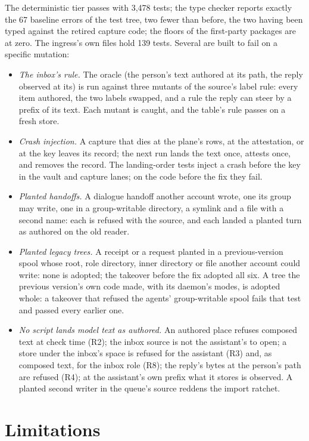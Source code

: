 \documentclass[11pt]{article}
\theoremstyle{plain}
\theoremstyle{definition}
\theoremstyle{remark}
\begin{document}
The deterministic tier passes with 3,478 tests; the type checker reports exactly the 67
baseline errors of the test tree, two fewer than before, the two having been typed against the
retired capture code; the floors of the first-party packages are at zero. The ingress's own
files hold 139 tests. Several are built to fail on a specific mutation:
\begin{itemize}
\item \emph{The inbox's rule.} The oracle (the person's text authored at its path, the reply
  observed at its) is run against three mutants of the source's label rule: every item authored,
  the two labels swapped, and a rule the reply can steer by a prefix of its text. Each mutant is
  caught, and the table's rule passes on a fresh store.
\item \emph{Crash injection.} A capture that dies at the plane's rows, at the attestation, or at
  the key leaves its record; the next run lands the text once, attests once, and removes the
  record. The landing-order tests inject a crash before the key in the vault and capture lanes;
  on the code before the fix they fail.
\item \emph{Planted handoffs.} A dialogue handoff another account wrote, one its group may
  write, one in a group-writable directory, a symlink and a file with a second name: each is
  refused with the source, and each landed a planted turn as authored on the old reader.
\item \emph{Planted legacy trees.} A receipt or a request planted in a previous-version spool
  whose root, role directory, inner directory or file another account could write: none is
  adopted; the takeover before the fix adopted all six. A tree the previous version's own code
  made, with its daemon's modes, is adopted whole: a takeover that refused the agents'
  group-writable spool fails that test and passed every earlier one.
\item \emph{No script lands model text as authored.} An authored place refuses composed text at
  check time (R2); the inbox source is not the assistant's to open; a store under the inbox's
  space is refused for the assistant (R3) and, as composed text, for the inbox role (R8); the
  reply's bytes at the person's path are refused (R4); at the assistant's own prefix what it
  stores is observed. A planted second writer in the queue's source reddens the import ratchet.
\end{itemize}

\section{Limitations}
\end{document}
